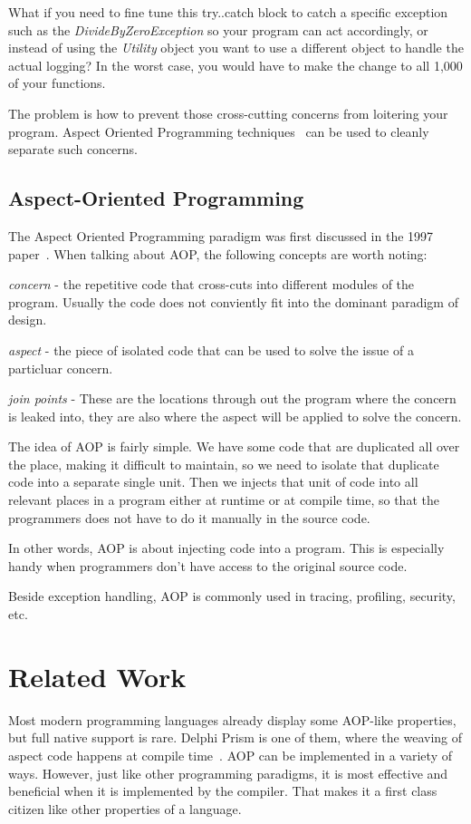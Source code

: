 What if you need to fine tune this try..catch block to catch a specific exception such as the {\em DivideByZeroException} so your program can act accordingly, or instead of using the {\em Utility} object you want to use a different object to handle the actual logging? In the worst case, you would have to make the change to all 1,000 of your functions.

The problem is how to prevent those cross-cutting concerns from loitering your program. Aspect Oriented Programming techniques~\cite{aop} can be used to cleanly separate such concerns.

\subsection{Aspect-Oriented Programming}
The Aspect Oriented Programming paradigm was first discussed in the 1997 paper~\cite{aop}. When talking about AOP, the following concepts are worth noting:

{\em concern} - the repetitive code that cross-cuts into different modules of the program. Usually the code does not conviently fit into the dominant paradigm of design.

{\em aspect} - the piece of isolated code that can be used to solve the issue of a particluar concern.

{\em join points} - These are the locations through out the program where the concern is leaked into, they are also where the aspect will be applied to solve the concern.

The idea of AOP is fairly simple. We have some code that are duplicated all over the place, making it difficult to maintain, so we need to isolate that duplicate code into a separate single unit. Then we injects that unit of code into all relevant places in a program either at runtime or at compile time, so that the programmers does not have to do it manually in the source code.

In other words, AOP is about injecting code into a program. This is especially handy when programmers don't have access to the original source code.

Beside exception handling, AOP is commonly used in tracing, profiling, security, etc.

\section{Related Work}Most modern programming languages already display some AOP-like properties, but full native support is rare. Delphi Prism is one of them, where the weaving of aspect code happens at compile time~\cite{delphi_prism2010}. AOP can be implemented in a variety of ways. However, just like other programming paradigms, it is most effective and beneficial when it is implemented by the compiler. That makes it a first class citizen like other properties of a language.


